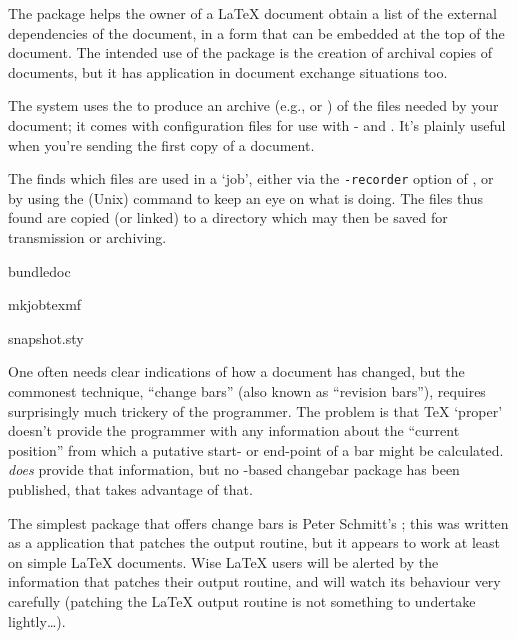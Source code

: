 The  package helps the owner of a \LaTeX{} document
obtain a list of the external dependencies of the document, in a form
that can be embedded at the top of the document.  The intended use of
the package is the creation of archival copies of documents, but it
has application in document exchange situations too.

The  system uses the  to produce an
archive (e.g.,  or ) of the files needed by your
document; it comes with configuration files for use with
\texlive{}- and \ProgName{\miktex{}}.  It's plainly useful when
you're sending the first copy of a document.

The  finds which files are used in a `job',
either via the \texttt{-recorder} option of \tex{}, or by using the
(Unix) command  to keep an eye on what \tex{} is
doing.  The files thus found are copied (or linked) to a directory
which may then be saved for transmission or archiving.
\begin{ctanrefs}
\item[bundledoc]
\item[mkjobtexmf]
\item[snapshot.sty]
\end{ctanrefs}


One often needs clear indications of how a document has changed, but
the commonest technique, ``change bars'' (also known as ``revision
bars''), requires surprisingly much
trickery of the programmer.  The problem is that \TeX{} `proper'
doesn't provide the programmer with any information about the
``current position'' from which a putative start- or end-point of a
bar might be calculated.   \PDFTeX{} \emph{does} provide that
information, but no \PDFTeX{}-based changebar package has been
published, that takes advantage of that.

The simplest package that offers change bars is Peter Schmitt's
; this was written as a \plaintex{} application
that patches the output routine, but it appears to work at least on
simple \LaTeX{} documents.  Wise \LaTeX{} users will be alerted by the
information that  patches their output routine, and
will watch its behaviour very carefully (patching the \LaTeX{} output
routine is not something to undertake lightly\dots{}).

